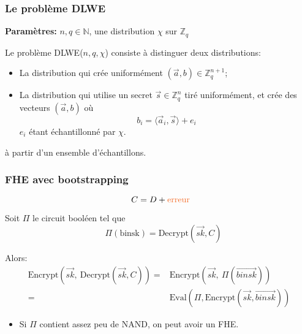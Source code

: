 \documentclass[10pt,xcolor={usenames,dvipsnames}]{beamer}
\newcommand{\ZZq}{\mathbb{Z}_q}
\begin{document}
  
\begin{frame} 
\frametitle{Le problème DLWE}
\textbf{Paramètres:} $n, q\in \mathbb{N}$, une distribution $\chi$ sur $\ZZq$

Le problème DLWE($n,q,\chi$) consiste à distinguer deux distributions:
\begin{itemize}
\item La distribution qui crée uniformément $(\vec{a}, b) \in \ZZq^{n+1}$;
\item La distribution qui utilise un secret $\vec{s}\in \ZZq^n$ tiré uniformément, 
et crée des vecteurs $(\vec{a}, b)$ où
\[ b_i = \langle \vec{a}_i, \vec{s} \rangle + e_i \] 
$e_i$ étant échantillonné par $\chi$.
\end{itemize}
à partir d'un ensemble d'échantillons.
\end{frame} 


\begin{frame} 
\frametitle{FHE avec bootstrapping}
\[ C = D + \text{\textcolor{Orange}{erreur}} \]
  \noindent
  \begin{center}
      \begin{tikzpicture}[scale = 1, transform shape]
      	
      \end{tikzpicture}
  \end{center}
  \noindent
  \vspace{-0.7cm}


\pause
Soit $\Pi$ le circuit booléen tel que 
\[\quad\Pi(\text{binsk})= \text{Decrypt}\left(\vec{sk}, C\right) \]

\pause
Alors:
\begin{align*}
\text{Encrypt}\left(\vec{sk},\: \text{Decrypt}\left(\vec{sk},C\right)\right) 
=& \text{Encrypt}\left(\vec{sk},\: \Pi(\overrightarrow{binsk})\right) \\
=& \text{Eval}\left(\Pi, \text{Encrypt}(\vec{sk}, \overrightarrow{binsk})\right)
\end{align*}
\vspace{-0.5cm}
\begin{itemize}
\item Si $\Pi$ contient assez peu de NAND, on peut avoir un FHE.
\end{itemize}

\end{frame} 
\end{document}
